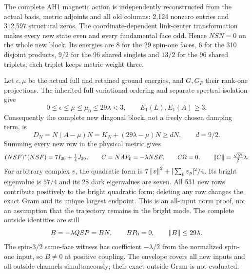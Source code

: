 The complete AH1 magnetic action is independently reconstructed from the actual basis, metric adjoints and all old columns: 2,124 nonzero entries and 312,597 structural zeros. The coordinate-dependent link-center transformation makes every new state even and every fundamental face odd. Hence $NSN=0$ on the whole new block. Its energies are $8$ for the 29 spin-one faces, $6$ for the 310 disjoint products, $9/2$ for the 96 shared singlets and $13/2$ for the 96 shared triplets; each triplet keeps metric weight three.

Let $\epsilon,\mu$ be the actual full and retained ground energies, and $G,G_P$ their rank-one projections. The inherited full variational ordering and separate spectral isolation give
\begin{equation}
 0\le\epsilon\le\mu\le\mu_0\le29\lambda<3,
 \qquad E_1(L),E_1(A)\ge3.
\end{equation}
Consequently the complete new diagonal block, not a freely chosen damping term, is
\begin{equation}
 D_N=N(A-\mu)N=K_N+(29\lambda-\mu)N\ge dN,
 \qquad d=9/2.
 \label{eq:ah2-damping}
\end{equation}
Summing every new row in the physical metric gives
\begin{equation}
 (NSF)^*(NSF)=7I_{29}+\tfrac14J_{29},\qquad
 C=NAP_0=-\lambda NSF,\qquad C\Omega=0,
 \qquad\left\lVert C\right\rVert=\tfrac{\sqrt{57}}2\lambda.
 \label{eq:ah2-full-gram}
\end{equation}
For arbitrary complex $v$, the quadratic form is $7\left\lVert v\right\rVert^2+|\sum_pv_p|^2/4$. Its bright eigenvalue is $57/4$ and its 28 dark eigenvalues are seven. All 531 new rows contribute positively to the bright quadratic form; deleting any row changes the exact Gram and its unique largest endpoint. This is an all-input norm proof, not an assumption that the trajectory remains in the bright mode. The complete outside identities are still
\begin{equation}
 B=-\lambda QSP=BN,\qquad BP_0=0,\qquad\left\lVert B\right\rVert\le29\lambda.
\end{equation}
The spin-$3/2$ same-face witness has coefficient $-\lambda/2$ from the normalized spin-one input, so $B\ne0$ at positive coupling. The envelope covers all new inputs and all outside channels simultaneously; their exact outside Gram is not evaluated.

